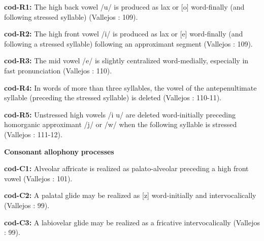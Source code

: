 \begin{styleBody}
\textbf{cod-R1:} The high back vowel /u/ is produced as lax or [o] word-finally (and following stressed syllable) (Vallejos \citealt{Yopán2010}: 109).
\end{styleBody}

\begin{styleBody}
\textbf{cod-R2:} The high front vowel /i/ is produced as lax or [e] word-finally (and following a stressed syllable) following an approximant segment (Vallejos \citealt{Yopán2010}: 109).
\end{styleBody}

\begin{styleBody}
\textbf{cod-R3:} The mid vowel /e/ is slightly centralized word-medially, especially in fast pronunciation (Vallejos \citealt{Yopán2010}: 110).
\end{styleBody}

\begin{styleBody}
\textbf{cod-R4:} In words of more than three syllables, the vowel of the antepenultimate syllable (preceding the stressed syllable) is deleted (Vallejos \citealt{Yopán2010}: 110-11).
\end{styleBody}

\begin{styleBody}
\textbf{cod-R5:} Unstressed high vowels /i u/ are deleted word-initially preceding homorganic approximant /j/ or /w/ when the following syllable is stressed (Vallejos \citealt{Yopán2010}: 111-12).
\end{styleBody}

\begin{styleBody}
\textbf{Consonant} \textbf{allophony} \textbf{processes}
\end{styleBody}

\begin{styleBody}
\textbf{cod-C1:} Alveolar affricate is realized as palato-alveolar preceding a high front vowel (Vallejos \citealt{Yopán2010}: 101).
\end{styleBody}

\begin{styleBody}
\textbf{cod-C2:} A palatal glide may be realized as [z] word-initially and intervocalically (Vallejos \citealt{Yopán2010}: 99).
\end{styleBody}

\begin{styleBody}
\textbf{cod-C3:} A labiovelar glide may be realized as a fricative intervocalically (Vallejos \citealt{Yopán2010}: 99).
\end{styleBody}

